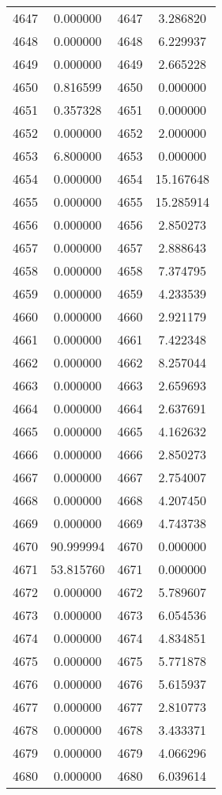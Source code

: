 \documentclass[12pt]{article}
\begin{document}
\begin{longtable}{@{}cccc@{}}
4647 & 0.000000 & 4647 & 3.286820 \\
4648 & 0.000000 & 4648 & 6.229937 \\
4649 & 0.000000 & 4649 & 2.665228 \\
4650 & 0.816599 & 4650 & 0.000000 \\
4651 & 0.357328 & 4651 & 0.000000 \\
4652 & 0.000000 & 4652 & 2.000000 \\
4653 & 6.800000 & 4653 & 0.000000 \\
4654 & 0.000000 & 4654 & 15.167648 \\
4655 & 0.000000 & 4655 & 15.285914 \\
4656 & 0.000000 & 4656 & 2.850273 \\
4657 & 0.000000 & 4657 & 2.888643 \\
4658 & 0.000000 & 4658 & 7.374795 \\
4659 & 0.000000 & 4659 & 4.233539 \\
4660 & 0.000000 & 4660 & 2.921179 \\
4661 & 0.000000 & 4661 & 7.422348 \\
4662 & 0.000000 & 4662 & 8.257044 \\
4663 & 0.000000 & 4663 & 2.659693 \\
4664 & 0.000000 & 4664 & 2.637691 \\
4665 & 0.000000 & 4665 & 4.162632 \\
4666 & 0.000000 & 4666 & 2.850273 \\
4667 & 0.000000 & 4667 & 2.754007 \\
4668 & 0.000000 & 4668 & 4.207450 \\
4669 & 0.000000 & 4669 & 4.743738 \\
4670 & 90.999994 & 4670 & 0.000000 \\
4671 & 53.815760 & 4671 & 0.000000 \\
4672 & 0.000000 & 4672 & 5.789607 \\
4673 & 0.000000 & 4673 & 6.054536 \\
4674 & 0.000000 & 4674 & 4.834851 \\
4675 & 0.000000 & 4675 & 5.771878 \\
4676 & 0.000000 & 4676 & 5.615937 \\
4677 & 0.000000 & 4677 & 2.810773 \\
4678 & 0.000000 & 4678 & 3.433371 \\
4679 & 0.000000 & 4679 & 4.066296 \\
4680 & 0.000000 & 4680 & 6.039614 \\

\end{longtable}
\end{document}
